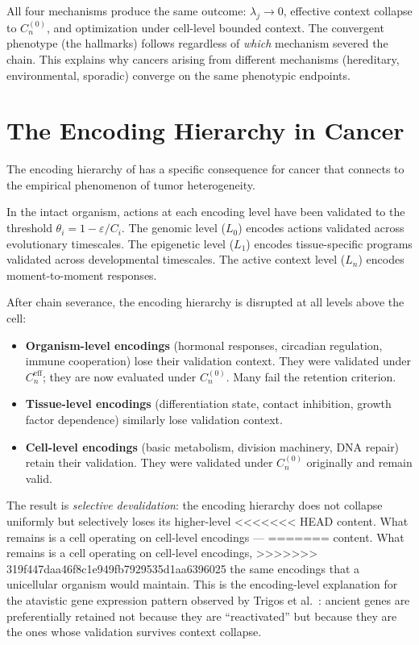 \documentclass[11pt]{article}
\theoremstyle{definition}
\theoremstyle{remark}
\begin{document}
All four mechanisms produce the same outcome: $\lambda_j \to 0$,
effective context collapse to $C_n^{(0)}$, and optimization under
cell-level bounded context. The convergent phenotype (the hallmarks)
follows regardless of \emph{which} mechanism severed the chain.
This explains why cancers arising from different mechanisms
(hereditary, environmental, sporadic) converge on the same
phenotypic endpoints.

\section{The Encoding Hierarchy in Cancer}
\label{sec:encoding}

The encoding hierarchy of \cite{McCarthy2026d} has a specific
consequence for cancer that connects to the empirical phenomenon of
tumor heterogeneity.

In the intact organism, actions at each encoding level have been
validated to the threshold $\theta_i = 1 - \varepsilon / C_i$. The
genomic level ($L_0$) encodes actions validated across evolutionary
timescales. The epigenetic level ($L_1$) encodes tissue-specific
programs validated across developmental timescales. The active
context level ($L_n$) encodes moment-to-moment responses.

After chain severance, the encoding hierarchy is disrupted at all
levels above the cell:

\begin{itemize}
\item \textbf{Organism-level encodings} (hormonal responses,
   circadian regulation, immune cooperation) lose their validation
   context. They were validated under $C_n^{\mathrm{eff}}$; they are
   now evaluated under $C_n^{(0)}$. Many fail the retention criterion.

\item \textbf{Tissue-level encodings} (differentiation state,
   contact inhibition, growth factor dependence) similarly lose
   validation context.

\item \textbf{Cell-level encodings} (basic metabolism, division
   machinery, DNA repair) retain their validation. They were
   validated under $C_n^{(0)}$ originally and remain valid.
\end{itemize}

The result is \emph{selective devalidation}: the encoding hierarchy
does not collapse uniformly but selectively loses its higher-level
<<<<<<< HEAD
content. What remains is a cell operating on cell-level encodings ---
=======
content. What remains is a cell operating on cell-level encodings,
>>>>>>> 319f447daa46f8c1e949fb7929535d1aa6396025
the same encodings that a unicellular organism would maintain. This
is the encoding-level explanation for the atavistic gene expression
pattern observed by Trigos et al.\ \cite{Trigos2017}: ancient genes
are preferentially retained not because they are ``reactivated'' but
because they are the ones whose validation survives context collapse.
\end{document}
